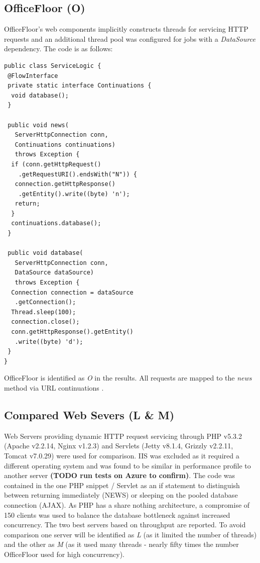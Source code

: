 \documentclass[conference]{ieee/IEEEtran}
\begin{document}
\subsection{OfficeFloor (O)}
OfficeFloor's web components implicitly constructs threads for servicing HTTP
requests and an additional thread pool was configured for jobs with a
\textit{DataSource} dependency.  The code is as follows:

\begin{verbatim}
public class ServiceLogic {
 @FlowInterface
 private static interface Continuations {
  void database();
 }

 public void news(
   ServerHttpConnection conn, 
   Continuations continuations) 
   throws Exception { 
  if (conn.getHttpRequest()
    .getRequestURI().endsWith("N")) {
   connection.getHttpResponse()
    .getEntity().write((byte) 'n');
   return;
  }
  continuations.database();
 }

 public void database(
   ServerHttpConnection conn,
   DataSource dataSource) 
   throws Exception {
  Connection connection = dataSource
   .getConnection();
  Thread.sleep(100);
  connection.close();
  conn.getHttpResponse().getEntity()
   .write((byte) 'd');
 }
}
\end{verbatim}
   
OfficeFloor is identified as \textit{O} in the results.  All requests are mapped
to the \textit{news} method via URL continuations \cite{url-continuation}.


\subsection{Compared Web Severs (L \& M)}
Web Servers providing dynamic HTTP request servicing through PHP v5.3.2 (Apache
v2.2.14, Nginx v1.2.3) and Servlets (Jetty v8.1.4, Grizzly v2.2.11, Tomcat
v7.0.29) were used for comparison.  IIS was excluded as it required a different
operating system and was found to be similar in performance profile to another
server \textbf{(TODO run tests on Azure to confirm)}.  The code was contained in
the one PHP snippet / Servlet as an if statement to distinguish between
returning immediately (NEWS) or sleeping on the pooled database connection
(AJAX).  As PHP has a share nothing architecture, a compromise of 150 clients
was used to balance the database bottleneck against increased concurrency.  The
two best servers based on throughput are reported. To avoid comparison one
server will be identified as \textit{L} (as it limited the number of threads)
and the other as \textit{M} (as it used many threads - nearly fifty times the
number OfficeFloor used for high concurrency).
\end{document}
